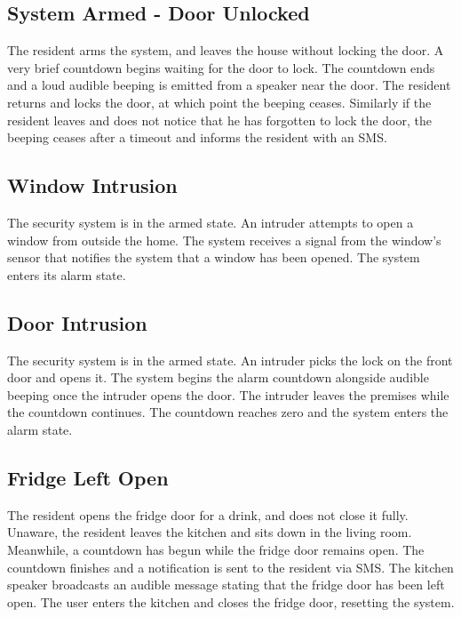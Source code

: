 \documentclass{report}
\begin{document}
\subsection*{System Armed - Door Unlocked}

The resident arms the system, and leaves the house without locking the door.
A very brief countdown begins waiting for the door to lock. The countdown
ends and a loud audible beeping is emitted from a speaker near the door. The
resident returns and locks the door, at which point the beeping ceases.
Similarly if the resident leaves and does not notice that he has forgotten to
lock the door, the beeping ceases after a timeout and informs the resident with
an SMS.

\subsection*{Window Intrusion}

The security system is in the armed state. An intruder attempts to open a
window from outside the home. The system receives a signal from the window's
sensor that notifies the system that a window has been opened. The system
enters its alarm state.

\subsection*{Door Intrusion}

The security system is in the armed state. An intruder picks the lock on the
front door and opens it.  The system begins the alarm countdown alongside
audible beeping once the intruder opens the door.  The intruder leaves the
premises while the countdown continues. The countdown reaches zero and the
system enters the alarm state.

\subsection*{Fridge Left Open}

The resident opens the fridge door for a drink, and does not close it fully.
Unaware, the resident leaves the kitchen and sits down in the living room.
Meanwhile, a countdown has begun while the fridge door remains open. The
countdown finishes and a notification is sent to the resident via SMS. The
kitchen speaker broadcasts an audible message stating that the fridge door has
been left open. The user enters the kitchen and closes the fridge door,
resetting the system. 
\end{document}
